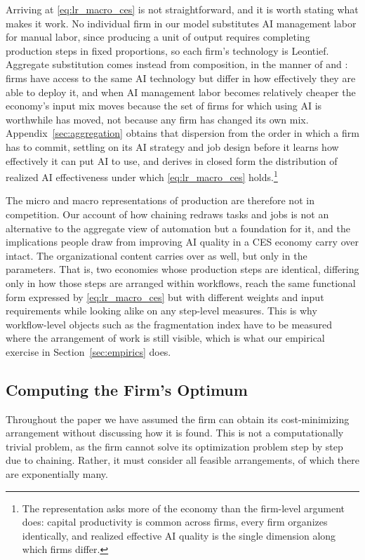 Arriving at \eqref{eq:lr_macro_ces} is not straightforward, and it is worth stating what makes it work.
No individual firm in our model substitutes AI management labor for manual labor, since producing a unit of output requires completing production steps in fixed proportions, so each firm's technology is Leontief.
Aggregate substitution comes instead from composition, in the manner of \citet{houthakker1955pareto} and \citet{levhari1968note}: firms have access to the same AI technology but differ in how effectively they are able to deploy it, and when AI management labor becomes relatively cheaper the economy's input mix moves because the set of firms for which using AI is worthwhile has moved, not because any firm has changed its own mix.
Appendix~\ref{sec:aggregation} obtains that dispersion from the order in which a firm has to commit, settling on its AI strategy and job design before it learns how effectively it can put AI to use, and derives in closed form the distribution of realized AI effectiveness under which \eqref{eq:lr_macro_ces} holds.\footnote{
The representation asks more of the economy than the firm-level argument does: capital productivity is common across firms, every firm organizes identically, and realized effective AI quality is the single dimension along which firms differ.
}

The micro and macro representations of production are therefore not in competition.
Our account of how chaining redraws tasks and jobs is not an alternative to the aggregate view of automation but a foundation for it, and the implications people draw from improving AI quality in a CES economy carry over intact.
The organizational content carries over as well, but only in the parameters. 
That is, two economies whose production steps are identical, differing only in how those steps are arranged within workflows, reach the same functional form expressed by \eqref{eq:lr_macro_ces} but with different weights and input requirements while looking alike on any step-level measures.
This is why workflow-level objects such as the fragmentation index have to be measured where the arrangement of work is still visible, which is what our empirical exercise in Section~\ref{sec:empirics} does.


\subsection{Computing the Firm's Optimum}
\label{sec:extensions.computation}

Throughout the paper we have assumed the firm can obtain its cost-minimizing arrangement without discussing how it is found.
This is not a computationally trivial problem, as the firm cannot solve its optimization problem step by step due to chaining. 
Rather, it must consider all feasible arrangements, of which there are exponentially many.

